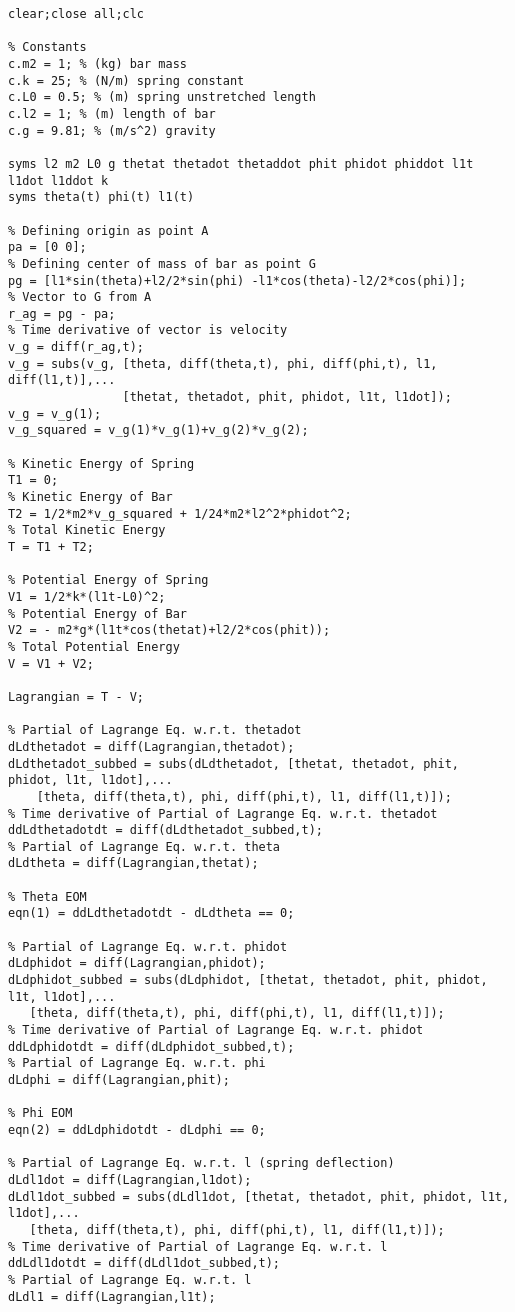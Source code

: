 \begin{lstlisting}[frame=lines,style=Matlab-editor,basicstyle = \mlttfamily]
clear;close all;clc

% Constants
c.m2 = 1; % (kg) bar mass
c.k = 25; % (N/m) spring constant
c.L0 = 0.5; % (m) spring unstretched length
c.l2 = 1; % (m) length of bar
c.g = 9.81; % (m/s^2) gravity

syms l2 m2 L0 g thetat thetadot thetaddot phit phidot phiddot l1t l1dot l1ddot k
syms theta(t) phi(t) l1(t)

% Defining origin as point A
pa = [0 0];
% Defining center of mass of bar as point G
pg = [l1*sin(theta)+l2/2*sin(phi) -l1*cos(theta)-l2/2*cos(phi)];
% Vector to G from A
r_ag = pg - pa;
% Time derivative of vector is velocity
v_g = diff(r_ag,t);
v_g = subs(v_g, [theta, diff(theta,t), phi, diff(phi,t), l1, diff(l1,t)],...
                [thetat, thetadot, phit, phidot, l1t, l1dot]);
v_g = v_g(1);
v_g_squared = v_g(1)*v_g(1)+v_g(2)*v_g(2);

% Kinetic Energy of Spring
T1 = 0;
% Kinetic Energy of Bar
T2 = 1/2*m2*v_g_squared + 1/24*m2*l2^2*phidot^2;
% Total Kinetic Energy
T = T1 + T2;

% Potential Energy of Spring
V1 = 1/2*k*(l1t-L0)^2;
% Potential Energy of Bar
V2 = - m2*g*(l1t*cos(thetat)+l2/2*cos(phit));
% Total Potential Energy
V = V1 + V2;

Lagrangian = T - V;

% Partial of Lagrange Eq. w.r.t. thetadot
dLdthetadot = diff(Lagrangian,thetadot);
dLdthetadot_subbed = subs(dLdthetadot, [thetat, thetadot, phit, phidot, l1t, l1dot],...
    [theta, diff(theta,t), phi, diff(phi,t), l1, diff(l1,t)]);
% Time derivative of Partial of Lagrange Eq. w.r.t. thetadot
ddLdthetadotdt = diff(dLdthetadot_subbed,t);
% Partial of Lagrange Eq. w.r.t. theta
dLdtheta = diff(Lagrangian,thetat);

% Theta EOM
eqn(1) = ddLdthetadotdt - dLdtheta == 0;

% Partial of Lagrange Eq. w.r.t. phidot
dLdphidot = diff(Lagrangian,phidot);
dLdphidot_subbed = subs(dLdphidot, [thetat, thetadot, phit, phidot, l1t, l1dot],...
   [theta, diff(theta,t), phi, diff(phi,t), l1, diff(l1,t)]);
% Time derivative of Partial of Lagrange Eq. w.r.t. phidot
ddLdphidotdt = diff(dLdphidot_subbed,t);
% Partial of Lagrange Eq. w.r.t. phi
dLdphi = diff(Lagrangian,phit);

% Phi EOM
eqn(2) = ddLdphidotdt - dLdphi == 0;

% Partial of Lagrange Eq. w.r.t. l (spring deflection)
dLdl1dot = diff(Lagrangian,l1dot);
dLdl1dot_subbed = subs(dLdl1dot, [thetat, thetadot, phit, phidot, l1t, l1dot],...
   [theta, diff(theta,t), phi, diff(phi,t), l1, diff(l1,t)]);
% Time derivative of Partial of Lagrange Eq. w.r.t. l
ddLdl1dotdt = diff(dLdl1dot_subbed,t);
% Partial of Lagrange Eq. w.r.t. l
dLdl1 = diff(Lagrangian,l1t);


\end{lstlisting}
